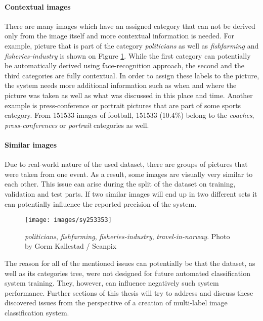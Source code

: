 \paragraph{Contextual images}
There are many images which have an assigned category that can not be derived only from the image itself and more contextual information is needed. For example, picture that is part of the category \textit{politicians} as well as \textit{fishfarming} and \textit{fisheries-industry} is shown on Figure \ref{fig:politician-fish}. While the first category can potentially be automatically derived using face-recognition approach, the second and the third categories are fully contextual. In order to assign these labels to the picture, the system needs more additional information such as when and where the picture was taken as well as what was discussed in this place and time. Another example is press-conference or portrait pictures that are part of some sports category. From 151533 images of football, 151533 (10.4\%) belong to the \textit{coaches}, \textit{press-conferences} or \textit{portrait} categories as well.

\paragraph{Similar images}
Due to real-world nature of the used dataset, there are groups of pictures that were taken from one event. As a result, some images are visually very similar to each other. This issue can arise during the split of the dataset on training, validation and test parts. If two similar images will end up in two different sets it can potentially influence the reported precision of the system.

\begin{figure}[h]
    \centering
    \texttt{[image: images/sy253353]}
    \caption[Example of contextual image]{\textit{politicians}, \textit{fishfarming}, \textit{fisheries-industry}, \textit{travel-in-norway}. Photo by Gorm Kallestad / Scanpix}
    \label{fig:politician-fish}
\end{figure}

The reason for all of the mentioned issues can potentially be that the dataset, as well as its categories tree, were not designed for future automated classification system training. They, however, can influence negatively such system performance. Further sections of this thesis will try to address and discuss these discovered issues from the perspective of a creation of multi-label image classification system.

